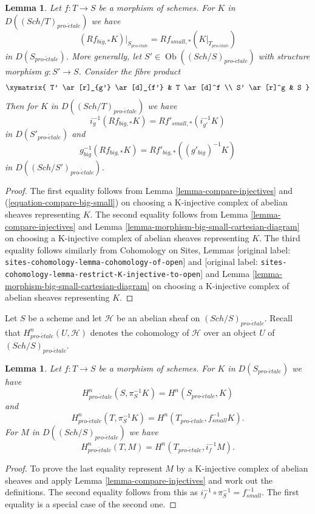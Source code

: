 \documentclass[10pt,a4paper]{article}
\theoremstyle{plain}
\newtheorem{lemma}[subsection]{Lemma}
\theoremstyle{definition}
\theoremstyle{remark}
\numberwithin{equation}{subsection}
\def\Sch{\mathit{Sch}}
\def\Ob{\mathop{\mathrm{Ob}}\nolimits}
\def\proetale{{pro\text{-}\acute{e}tale}}
\begin{document}
\begin{lemma}
\label{lemma-compare-higher-direct-image}
Let $f : T \to S$ be a morphism of schemes.
For $K$ in $D((\Sch/T)_\proetale)$ we have
$$
(Rf_{big, *}K)|_{S_\proetale} = Rf_{small, *}(K|_{T_\proetale})
$$
in $D(S_\proetale)$. More generally, let $S' \in \Ob((\Sch/S)_\proetale)$
with structure morphism $g : S' \to S$. Consider the fibre product
$$
\xymatrix{
T' \ar[r]_{g'} \ar[d]_{f'} & T \ar[d]^f \\
S' \ar[r]^g & S
}
$$
Then for $K$ in $D((\Sch/T)_\proetale)$ we have
$$
i_g^{-1}(Rf_{big, *}K) = Rf'_{small, *}(i_{g'}^{-1}K)
$$
in $D(S'_\proetale)$ and
$$
g_{big}^{-1}(Rf_{big, *}K) = Rf'_{big, *}((g'_{big})^{-1}K)
$$
in $D((\Sch/S')_\proetale)$.
\end{lemma}

\begin{proof}
The first equality follows from Lemma \ref{lemma-compare-injectives}
and (\ref{equation-compare-big-small})
on choosing a K-injective complex of abelian sheaves representing $K$.
The second equality follows from Lemma \ref{lemma-compare-injectives}
and Lemma
\ref{lemma-morphism-big-small-cartesian-diagram}
on choosing a K-injective complex of abelian sheaves representing $K$.
The third equality follows similarly from
Cohomology on Sites, Lemmas \textnormal{[original label: \nolinkurl{sites-cohomology-lemma-cohomology-of-open}]} and
\textnormal{[original label: \nolinkurl{sites-cohomology-lemma-restrict-K-injective-to-open}]}
and Lemma \ref{lemma-morphism-big-small-cartesian-diagram}
on choosing a K-injective complex of abelian sheaves representing $K$.
\end{proof}

\noindent
Let $S$ be a scheme and let $\mathcal{H}$ be an abelian sheaf on
$(\Sch/S)_\proetale$. Recall that $H^n_\proetale(U, \mathcal{H})$ denotes
the cohomology of $\mathcal{H}$ over an object $U$ of $(\Sch/S)_\proetale$.

\begin{lemma}
\label{lemma-compare-cohomology-big-small}
Let $f : T \to S$ be a morphism of schemes. For $K$ in $D(S_\proetale)$
we have
$$
H^n_\proetale(S, \pi_S^{-1}K) = H^n(S_\proetale, K)
$$
and
$$
H^n_\proetale(T, \pi_S^{-1}K) = H^n(T_\proetale, f_{small}^{-1}K).
$$
For $M$ in $D((\Sch/S)_\proetale)$ we have
$$
H^n_\proetale(T, M) = H^n(T_\proetale, i_f^{-1}M).
$$
\end{lemma}

\begin{proof}
To prove the last equality represent $M$
by a K-injective complex of abelian sheaves
and apply Lemma \ref{lemma-compare-injectives}
and work out the definitions. The second equality follows from
this as $i_f^{-1} \circ \pi_S^{-1} = f_{small}^{-1}$. The first
equality is a special
case of the second one.
\end{proof}
\end{document}
